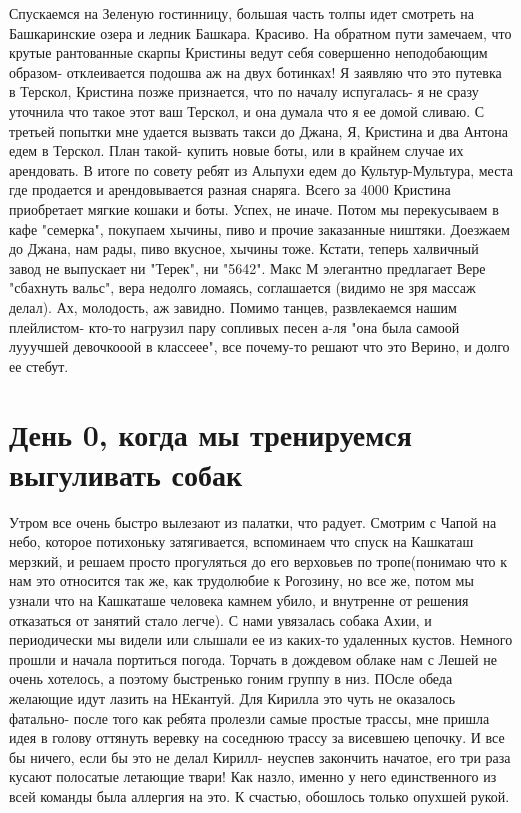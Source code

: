 \documentclass[]{article}
\begin{document}
Спускаемся на Зеленую гостинницу, большая часть толпы идет смотреть на Башкаринские озера и ледник Башкара. Красиво.
На обратном пути замечаем, что крутые рантованные скарпы Кристины ведут себя совершенно неподобающим образом- отклеивается подошва аж на двух ботинках! Я заявляю что это путевка в Терскол, Кристина позже признается, что по началу испугалась- я не сразу уточнила что такое этот ваш Терскол, и она думала что я ее домой сливаю. С третьей попытки мне удается вызвать такси до Джана, Я, Кристина и два Антона едем в Терскол. План такой- купить новые боты, или в крайнем случае их арендовать. В итоге по совету ребят из Альпухи едем до Культур-Мультура, места где продается и арендовывается разная снаряга. Всего за 4000 Кристина приобретает мягкие кошаки и боты. Успех, не иначе. Потом мы перекусываем в кафе "семерка", покупаем хычины, пиво и прочие заказанные ништяки. Доезжаем до Джана, нам рады, пиво вкусное, хычины тоже. Кстати, теперь халвичный завод не выпускает ни "Терек", ни "5642". Макс М элегантно предлагает Вере "сбахнуть вальс", вера недолго ломаясь, соглашается (видимо не зря массаж делал). Ах, молодость, аж завидно. Помимо танцев, развлекаемся нашим плейлистом- кто-то нагрузил пару сопливых песен а-ля "она была самоой лууучшей девочкооой в классеее", все почему-то решают что это Верино, и долго ее стебут. 

\section{День 0, когда мы тренируемся выгуливать собак}

Утром все очень быстро вылезают из палатки, что радует. Смотрим с Чапой на небо, которое потихоньку затягивается, вспоминаем что спуск на Кашкаташ мерзкий, и решаем просто прогуляться до его верховьев по тропе(понимаю что к нам это относится так же, как трудолюбие к Рогозину, но все же, потом мы узнали что на Кашкаташе человека камнем убило, и внутренне от решения отказаться от занятий стало легче). С нами увязалась собака Ахии, и периодически мы видели или слышали ее из каких-то удаленных кустов. Немного прошли и начала портиться погода. Торчать в дождевом облаке нам с Лешей не очень хотелось, а поэтому быстренько гоним группу в низ. ПОсле обеда желающие идут лазить на НЕкантуй. Для Кирилла это чуть не оказалось фатально- после того как ребята пролезли самые простые трассы, мне пришла идея в голову оттянуть веревку на соседнюю трассу за висевшею цепочку. И все бы ничего, если бы это не делал Кирилл- неуспев закончить начатое, его три раза кусают полосатые летающие твари! Как назло, именно у него единственного из всей команды была аллергия на это. К счастью, обошлось только опухшей рукой.
\end{document}
